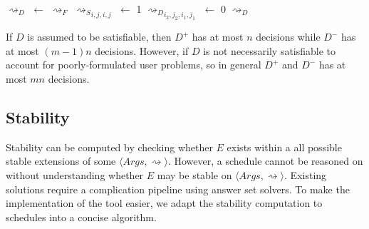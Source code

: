 \begin{algorithm}[H]
	\caption{}
	\begin{algorithmic}[1]
			\State $\rightsquigarrow_D$ $\gets$ $\rightsquigarrow_F$
				\State ${\rightsquigarrow_S}_{i,j,i,j}$ $\gets$ 1
			\EndFor
						\State ${\rightsquigarrow_D}_{i_2,j_2,i_1,j_1}$ $\gets$ 0				
					\EndFor
				\EndFor
			\EndFor
			\State \Return $\rightsquigarrow_D$
		\EndFunction
	\end{algorithmic}
\end{algorithm}

If $D$ is assumed to be satisfiable, then $D^+$ has at most $n$ decisions while $D^-$ has at most $(m-1)n$ decisions. However, if $D$ is not necessarily satisfiable to account for poorly-formulated user problems, so in general $D^+$ and $D^-$ has at most $mn$ decisions.

\subsection{Stability}

Stability can be computed by checking whether $E$ exists within a all possible stable extensions of some $\langle Args, \rightsquigarrow\rangle$. However, a schedule cannot be reasoned on without understanding whether $E$ may be stable on $\langle Args, \rightsquigarrow\rangle$. Existing solutions require a complication pipeline using answer set solvers. To make the implementation of the tool easier, we adapt the stability computation to schedules into a concise algorithm.

